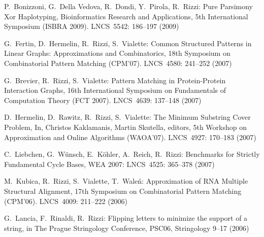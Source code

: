\begin{etaremune}
\vspace{-1.8mm}
  \item {P.~Bonizzoni, G.~Della Vedova, R.~Dondi, Y.~Pirola, R.~Rizzi:}
   \newblock Pure Parsimony Xor Haplotyping,
   \newblock Bioinformatics Research and Applications, 5th International Symposium (ISBRA 2009).
   \newblock LNCS~5542: 186--197 (2009)

\vspace{-1.8mm}
  \item {G.~Fertin, D.~Hermelin, R.~Rizzi, S.~Vialette:}
   \newblock Common Structured Patterns in Linear Graphs: Approximations and Combinatorics,
   \newblock 18th Symposium on Combinatorial Pattern Matching (CPM'07).
   \newblock LNCS~4580: 241--252 (2007)

\vspace{-1.8mm}
  \item {G.~Brevier, R.~Rizzi, S.~Vialette:}
   \newblock Pattern Matching in Protein-Protein Interaction Graphs,
   \newblock 16th International Symposium on Fundamentals
              of Computation Theory (FCT 2007).
   \newblock LNCS~4639: 137--148 (2007)

\vspace{-1.8mm}
  \item {D.~Hermelin, D.~Rawitz, R.~Rizzi, S.~Vialette:}
   \newblock The Minimum Substring Cover Problem,
   \newblock In, Christos Kaklamanis, Martin Skutella, editors,
   \newblock 5th Workshop on Approximation and Online Algorithms (WAOA'07).
   \newblock LNCS~4927: 170--183 (2007)

\vspace{-1.8mm}
  \item {C.~Liebchen, G.~W\"unsch, E.~K\"ohler, A.~Reich, R.~Rizzi:}
   \newblock Benchmarks for Strictly Fundamental Cycle Bases,
   \newblock WEA 2007:
   \newblock LNCS~4525: 365--378 (2007)

\vspace{-1.8mm}
  \item {M.~Kubica, R.~Rizzi, S.~Vialette, T.~Wale\'n:}
   \newblock Approximation of RNA Multiple Structural Alignment,
   \newblock 17th Symposium on Combinatorial Pattern Matching (CPM'06).
   \newblock LNCS~4009: 211--222 (2006)

\vspace{-1.8mm}
  \item {G.~Lancia, F.~Rinaldi, R.~Rizzi:}
   \newblock Flipping letters to minimize the support of a string,
   \newblock in The Prague Stringology Conference, PSC06,
   \newblock Stringology 9--17 (2006)


\end{etaremune}
